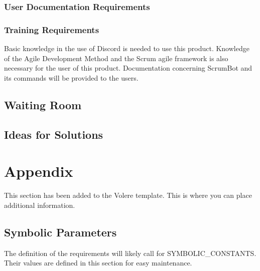 \documentclass[12pt, titlepage]{article}
\begin{document}
\subsubsection{User Documentation Requirements}


\subsubsection{Training Requirements}
Basic knowledge in the use of Discord is needed to use this product. Knowledge of the Agile Development Method and the Scrum agile framework is also necessary for the user of this product. Documentation concerning ScrumBot and its commands will be provided to the users.

\subsection{Waiting Room}

\subsection{Ideas for Solutions}





\newpage

\section{Appendix}

This section has been added to the Volere template.  This is where you can place
additional information.

\subsection{Symbolic Parameters}

The definition of the requirements will likely call for SYMBOLIC\_CONSTANTS.
Their values are defined in this section for easy maintenance.
\end{document}
